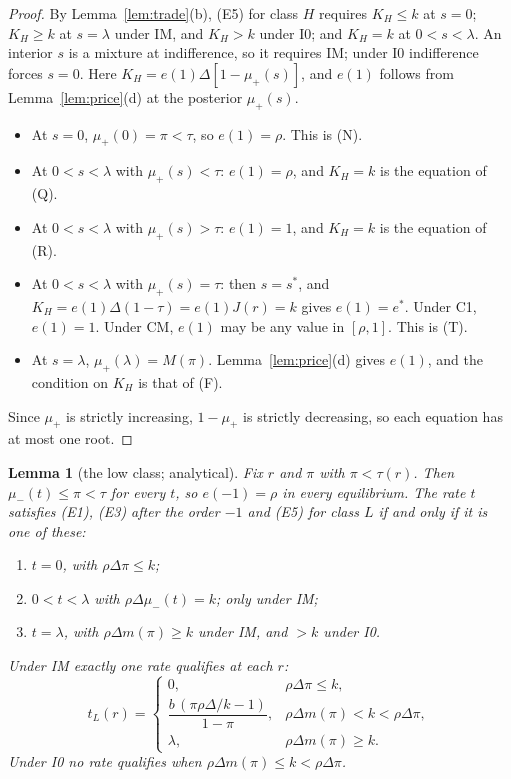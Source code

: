 \documentclass[11pt]{article}
\newtheorem{lemma}{Lemma}
\theoremstyle{definition}
\begin{document}
\begin{proof}
By Lemma~\ref{lem:trade}(b), (E5) for class $H$ requires $K_H\le k$ at $s=0$; $K_H\ge k$ at $s=\lambda$ under IM,
and $K_H>k$ under I0; and $K_H=k$ at $0<s<\lambda$. An interior $s$ is a mixture at indifference, so it requires
IM; under I0 indifference forces $s=0$. Here $K_H=e(1)\Delta[1-\mu_+(s)]$, and $e(1)$ follows from
Lemma~\ref{lem:price}(d) at the posterior $\mu_+(s)$.
\begin{itemize}
\item At $s=0$, $\mu_+(0)=\pi<\tau$, so $e(1)=\rho$. This is (N).
\item At $0<s<\lambda$ with $\mu_+(s)<\tau$: $e(1)=\rho$, and $K_H=k$ is the equation of (Q).
\item At $0<s<\lambda$ with $\mu_+(s)>\tau$: $e(1)=1$, and $K_H=k$ is the equation of (R).
\item At $0<s<\lambda$ with $\mu_+(s)=\tau$: then $s=s^*$, and $K_H=e(1)\Delta(1-\tau)=e(1)J(r)=k$ gives
  $e(1)=e^*$. Under C1, $e(1)=1$. Under CM, $e(1)$ may be any value in $[\rho,1]$. This is (T).
\item At $s=\lambda$, $\mu_+(\lambda)=M(\pi)$. Lemma~\ref{lem:price}(d) gives $e(1)$, and the condition on
  $K_H$ is that of (F).
\end{itemize}
Since $\mu_+$ is strictly increasing, $1-\mu_+$ is strictly decreasing, so each equation has at most one root.
\end{proof}

\begin{lemma}[the low class; analytical]\label{lem:L}
Fix $r$ and $\pi$ with $\pi<\tau(r)$. Then $\mu_-(t)\le\pi<\tau$ for every $t$, so $e(-1)=\rho$ in every
equilibrium. The rate $t$ satisfies (E1), (E3) after the order $-1$ and (E5) for class $L$ if and only if it is
one of these:
\begin{enumerate}
\item[(N)] $t=0$, with $\rho\Delta\pi\le k$;
\item[(Q)] $0<t<\lambda$ with $\rho\Delta\mu_-(t)=k$; only under IM;
\item[(F)] $t=\lambda$, with $\rho\Delta m(\pi)\ge k$ under IM, and $>k$ under I0.
\end{enumerate}
Under IM exactly one rate qualifies at each $r$:
\[
t_L(r)=\begin{cases}0, & \rho\Delta\pi\le k,\\[2pt]
\dfrac{b\,(\pi\rho\Delta/k-1)}{1-\pi}, & \rho\Delta m(\pi)<k<\rho\Delta\pi,\\[6pt]
\lambda, & \rho\Delta m(\pi)\ge k.\end{cases}
\]
Under I0 no rate qualifies when $\rho\Delta m(\pi)\le k<\rho\Delta\pi$.
\end{lemma}
\end{document}
